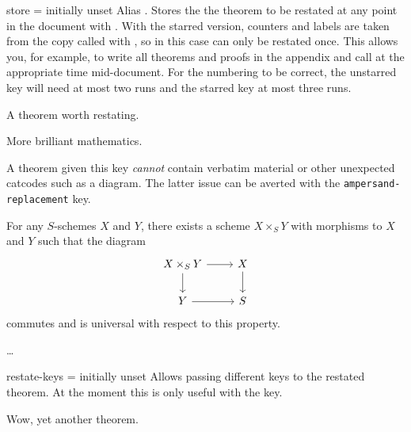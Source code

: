 \documentclass{ltxdoc}
\begin{document}
\begin{docKey}{store}
  {\sarg=}
  {initially unset}
Alias \sarg.
Stores the the theorem to be restated at any point in the document with .
With the starred version, counters and labels are taken from the copy called with , so in this case can only be restated once.
This allows you, for example, to write all theorems and proofs in the appendix and call  at the appropriate time mid-document.
For the numbering to be correct, the unstarred key will need at most two runs and the starred key at most three runs.

\begin{keythmscode}
\begin{theorem}[store=blub]
A theorem worth restating.
\end{theorem}
More brilliant mathematics.
\end{keythmscode}

A theorem given this key \emph{cannot} contain verbatim material or other unexpected catcodes such as a  diagram.
The latter issue can be averted with the \texttt{ampersand-replacement} key.

\begin{codepreamble}
\usepackage{tikz}
\usetikzlibrary{cd}
\end{codepreamble}

\begin{keythmscode}[withpreamble]
\begin{lemma}[store=fiberprod]
For any $S$-schemes $X$ and $Y$, there exists a scheme $X\times_S Y$ with morphisms to $X$ and $Y$ such that the diagram
\[\begin{tikzcd}[ampersand replacement=\&]
    X\times_S Y \ar[r] \ar[d] \& X \ar[d] \\
    Y \ar[r] \& S
  \end{tikzcd}\]
commutes and is universal with respect to this property.
\end{lemma}
\dots
{}
\end{keythmscode}

\end{docKey}

\begin{docKey}{restate-keys}
  {=}
  {initially unset}
Allows passing different keys to the restated theorem.
At the moment this is only useful with the  key.

\begin{keythmscode}
\begin{theorem}[
  store=rktest,
  note=Original,
  restate-keys={note=Restated},
  ]
Wow, yet another theorem.
\end{theorem}
\end{keythmscode}

\end{docKey}
\end{document}
